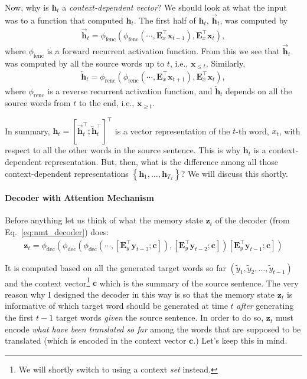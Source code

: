 \documentclass{report}
\newcommand{\vect}[1]{\mathbf{#1}}
\newcommand{\matr}[1]{\mathbf{#1}}
\newcommand{\vc}[0]{\vect{c}}
\newcommand{\vh}[0]{\vect{h}}
\newcommand{\vx}[0]{\vect{x}}
\newcommand{\vz}[0]{\vect{z}}
\newcommand{\vy}[0]{\vect{y}}
\newcommand{\mE}[0]{\matr{E}}
\newcommand{\fenc}{\text{fenc}}
\newcommand{\renc}{\text{renc}}
\newcommand{\dec}{\text{dec}}
\begin{document}
Now, why is $\vh_t$ a {\em context-dependent vector}? We should look at what the
input was to a function that computed $\vh_t$. The first half of $\vh_t$,
$\overrightarrow{\vh}_t$, was computed by
\begin{align*}
    \overrightarrow{\vh}_t = \phi_{\fenc}\left( \phi_{\fenc}\left( \cdots,
    \mE_x^\top \vx_{t-1}\right), \mE_x^\top \vx_{t}\right),
\end{align*}
where $\phi_{\fenc}$ is a forward recurrent activation function. From this we
see that $\overrightarrow{\vh}_t$ was computed by all the source words up to
$t$,
i.e., $\vx_{\leq t}$. Similarly, 
\begin{align*}
    \overleftarrow{\vh}_t = \phi_{\renc}\left( \phi_{\renc}\left( \cdots,
    \mE_x^\top \vx_{t+1}\right), \mE_x^\top \vx_{t}\right),
\end{align*}
where $\phi_{\renc}$ is a reverse recurrent activation function, and
$\overleftarrow{\vh}_t$ depends on all the source words from $t$ to the end,
i.e., $\vx_{\geq t}$. 

In summary, $\vh_{t} =\left[ \overrightarrow{\vh}_t^\top;
\overleftarrow{\vh}_t^\top \right]^\top$ is a vector representation of the
$t$-th word, $x_t$, with respect to all the other words in the source sentence.
This is why $\vh_t$ is a context-dependent representation. But, then, what is
the difference among all those context-dependent representations $\left\{
    \vh_1, \ldots, \vh_{T_x}
\right\}$? We will discuss this shortly.

\paragraph{Decoder with Attention Mechanism}

Before anything let us think of what the memory state $\vz_t$ of the decoder
(from Eq.~\eqref{eq:nmt_decoder}) does:
\begin{align*}
    \vz_t = \phi_{\dec}\left( 
        \phi_{\dec}\left(
            \phi_{\dec}\left(
                \cdots, 
                \left[ \mE_y^\top \vy_{t-3}; \vc \right]
            \right),
            \left[ \mE_y^\top \vy_{t-2}; \vc \right]
        \right)
        \left[ \mE_y^\top \vy_{t-1}; \vc \right]
    \right)
\end{align*} 

It is computed based on all the generated target words so far $(\tilde{y}_1,
\tilde{y}_2, \ldots, \tilde{y}_{t-1})$ and the context vector\footnote{
    We will shortly switch to using a context {\em set} instead.
}
$\vc$ which is the summary of the source sentence. The very reason why I
designed the decoder in this way is so that the memory state $\vz_t$ is
informative of which target word should be generated at time $t$ {\em after}
generating the first $t-1$ target words {\em given} the source sentence. In
order to do so, $\vz_t$ must encode {\em what have been translated so far} among
the words that are supposed to be translated (which is encoded in the context
vector $\vc$.) Let's keep this in mind.
\end{document}
